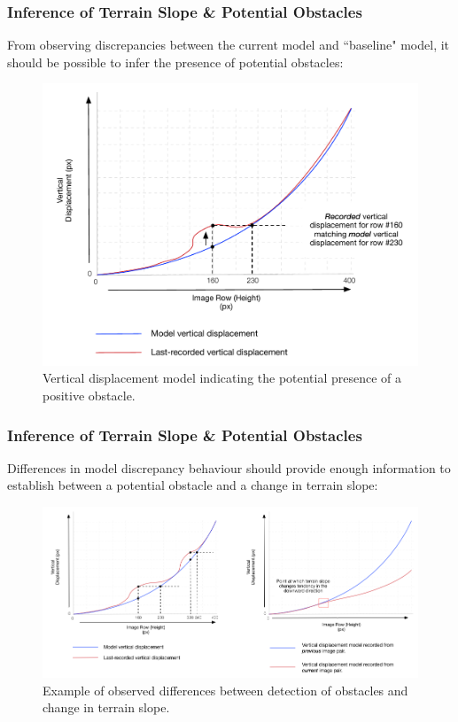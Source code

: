 \documentclass[10pt, compress]{beamer}
\begin{document}
\begin{frame}[fragile]
  \frametitle{Inference of Terrain Slope \& Potential Obstacles}

From observing discrepancies between the current model and ``baseline" model, it should be possible to infer the presence of potential obstacles: 

  \begin{figure}[ht!]
\centering
\includegraphics[scale=0.3]{obstacle_graph}
\caption{Vertical displacement model indicating the potential presence of a positive obstacle.}
  \end{figure}
  
  
\end{frame}

\begin{frame}[fragile]
  \frametitle{Inference of Terrain Slope \& Potential Obstacles}

Differences in model discrepancy behaviour should provide enough information to establish between a potential obstacle and a change in terrain slope: 

  \begin{figure}[ht!]
\centering
\includegraphics[scale=0.28]{slope_vs_obstacle}
\caption{Example of observed differences between detection of obstacles and change in terrain slope.}
  \end{figure}
  
  
\end{frame}
\end{document}
